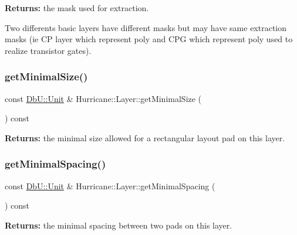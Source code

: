 {\bfseries Returns\+:} the mask used for extraction.

Two differents basic layers have different masks but may have same extraction masks (ie CP layer which represent poly and C\+PG which represent poly used to realize transistor gates). \mbox{\label{classHurricane_1_1Layer_afed9a488bf20daaeed18874f2b16268e}} 
\subsubsection{\texorpdfstring{get\+Minimal\+Size()}{getMinimalSize()}}
{\footnotesize\ttfamily const \mbox{\hyperlink{group__DbUGroup_ga4fbfa3e8c89347af76c9628ea06c4146}{Db\+U\+::\+Unit}} \& Hurricane\+::\+Layer\+::get\+Minimal\+Size (\begin{DoxyParamCaption}{ }\end{DoxyParamCaption}) const\hspace{0.3cm}{\ttfamily [inline]}}

{\bfseries Returns\+:} the minimal size allowed for a rectangular layout pad on this layer. \mbox{\label{classHurricane_1_1Layer_a6a03f9f40ca855d33763497162414062}} 
\subsubsection{\texorpdfstring{get\+Minimal\+Spacing()}{getMinimalSpacing()}}
{\footnotesize\ttfamily const \mbox{\hyperlink{group__DbUGroup_ga4fbfa3e8c89347af76c9628ea06c4146}{Db\+U\+::\+Unit}} \& Hurricane\+::\+Layer\+::get\+Minimal\+Spacing (\begin{DoxyParamCaption}{ }\end{DoxyParamCaption}) const\hspace{0.3cm}{\ttfamily [inline]}}

{\bfseries Returns\+:} the minimal spacing between two pads on this layer. \mbox{\label{classHurricane_1_1Layer_a7e953c126a02952e3a0b0d32f37e2ae0}} 

